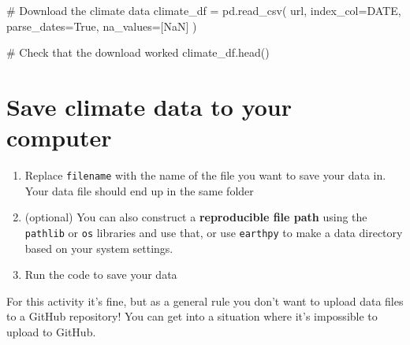 \documentclass[
  letterpaper,
  DIV=11,
  numbers=noendperiod,
  oneside]{scrreprt}
\newenvironment{Shaded}{\begin{snugshade}}{\end{snugshade}}
\newcommand{\CommentTok}[1]{\textcolor[rgb]{0.37,0.37,0.37}{#1}}
\newcommand{\NormalTok}[1]{\textcolor[rgb]{0.00,0.23,0.31}{#1}}
\newcommand{\OperatorTok}[1]{\textcolor[rgb]{0.37,0.37,0.37}{#1}}
\newcommand{\StringTok}[1]{\textcolor[rgb]{0.13,0.47,0.30}{#1}}
\newcommand{\VariableTok}[1]{\textcolor[rgb]{0.07,0.07,0.07}{#1}}
\providecommand{\tightlist}{%
  \setlength{\itemsep}{0pt}\setlength{\parskip}{0pt}}
\begin{document}
\begin{Shaded}
\begin{Highlighting}[]
\CommentTok{\# Download the climate data}
\NormalTok{climate\_df }\OperatorTok{=}\NormalTok{ pd.read\_csv(}
\NormalTok{    url,}
\NormalTok{    index\_col}\OperatorTok{=}\StringTok{\textquotesingle{}DATE\textquotesingle{}}\NormalTok{,}
\NormalTok{    parse\_dates}\OperatorTok{=}\VariableTok{True}\NormalTok{,}
\NormalTok{    na\_values}\OperatorTok{=}\NormalTok{[}\StringTok{\textquotesingle{}NaN\textquotesingle{}}\NormalTok{]}
\NormalTok{)}

\CommentTok{\# Check that the download worked}
\NormalTok{climate\_df.head()}
\end{Highlighting}
\end{Shaded}

\section{Save climate data to your
computer}\label{save-climate-data-to-your-computer}

\begin{tcolorbox}[enhanced jigsaw, colbacktitle=quarto-callout-color!10!white, opacityback=0, bottomtitle=1mm, toptitle=1mm, bottomrule=.15mm, left=2mm, colframe=quarto-callout-color-frame, leftrule=.75mm, opacitybacktitle=0.6, colback=white, rightrule=.15mm, toprule=.15mm, breakable, titlerule=0mm, title=\textcolor{quarto-callout-color}{\faInfo}\hspace{0.5em}{Try It}, coltitle=black, arc=.35mm]

\begin{enumerate}
\def\labelenumi{\arabic{enumi}.}
\tightlist
\item
  Replace \texttt{filename} with the name of the file you want to save
  your data in. Your data file should end up in the same folder\\
\item
  (optional) You can also construct a \textbf{reproducible file path}
  using the \texttt{pathlib} or \texttt{os} libraries and use that, or
  use \texttt{earthpy} to make a data directory based on your system
  settings.
\item
  Run the code to save your data
\end{enumerate}

\end{tcolorbox}

\begin{tcolorbox}[enhanced jigsaw, colbacktitle=quarto-callout-warning-color!10!white, opacityback=0, bottomtitle=1mm, toptitle=1mm, bottomrule=.15mm, left=2mm, colframe=quarto-callout-warning-color-frame, leftrule=.75mm, opacitybacktitle=0.6, colback=white, rightrule=.15mm, toprule=.15mm, breakable, titlerule=0mm, title=\textcolor{quarto-callout-warning-color}{\faExclamationTriangle}\hspace{0.5em}{Warning}, coltitle=black, arc=.35mm]

For this activity it's fine, but as a general rule you don't want to
upload data files to a GitHub repository! You can get into a situation
where it's impossible to upload to GitHub.

\end{tcolorbox}
\end{document}
